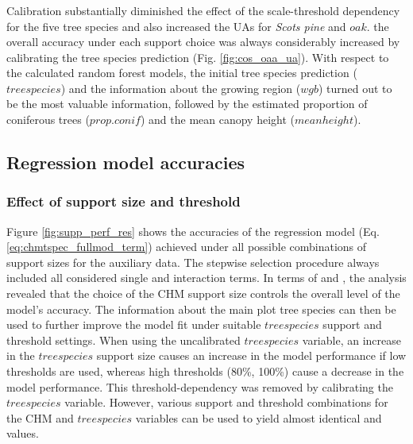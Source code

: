 \subsubsection*{}
Calibration substantially diminished the effect of the scale-threshold dependency for the five tree species and also increased the UAs for \textit{Scots pine} and $oak$.  the overall accuracy under each support choice was always considerably increased by calibrating the tree species prediction (Fig. \ref{fig:cos_oaa_ua}). With respect to the calculated random forest models, the initial tree species prediction ($treespecies$) and the information about the growing region ($wgb$) turned out to be the most valuable information, followed by the estimated proportion of coniferous trees ($prop.conif$) and the mean canopy height ($meanheight$).


\subsection{Regression model accuracies}
\label{sec:supp_chm_tspec_res}


\subsubsection*{Effect of support size and threshold}

Figure \ref{fig:supp_perf_res} shows the accuracies of the regression model (Eq. \ref{eq:chmtspec_fullmod_term}) achieved under all possible combinations of support sizes for the auxiliary data. The stepwise selection procedure always included all considered single and interaction terms. In terms of \adjrsq{} and \rmsecv{}, the analysis revealed that the choice of the CHM support size controls the overall level of the model's accuracy. The information about the main plot tree species can then be used to further improve the model fit under suitable $treespecies$ support and threshold settings. When using the uncalibrated $treespecies$ variable, an increase in the $treespecies$ support size causes an increase in the model performance if low thresholds are used, whereas high thresholds (80\%, 100\%) cause a decrease in the model performance. This threshold-dependency was removed by calibrating the $treespecies$ variable.  However, various support and threshold combinations for the CHM and $treespecies$ variables can be used to yield almost identical \rmsecv{} and \adjrsq{} values.

